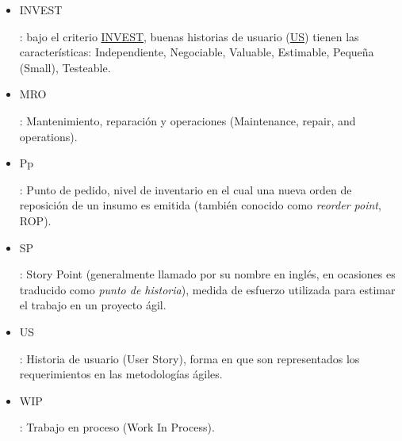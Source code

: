 \documentclass[a4paper, 12pt,twoside]{report}  %
\numberwithin{equation}{subsection} %
\begin{document}
\begin{itemize}
\item \hypertarget{INVEST}{INVEST}: bajo el criterio \hyperlink{INVEST}{INVEST}, buenas historias de usuario (\hyperlink{US}{US}) tienen las características: Independiente, Negociable, Valuable, Estimable, Pequeña (Small), Testeable.
\item \hypertarget{MRO}{MRO}: Mantenimiento, reparación y operaciones (Maintenance, repair, and operations).
\item \hypertarget{Pp}{Pp}: Punto de pedido, nivel de inventario en el cual una nueva orden de reposición de un insumo es emitida (también conocido como \textit{reorder point}, ROP).
\item \hypertarget{SP}{SP}: Story Point (generalmente llamado por su nombre en inglés, en ocasiones es traducido como \textit{punto de historia}), medida de esfuerzo utilizada para estimar el trabajo en un proyecto ágil.
\item \hypertarget{US}{US}: Historia de usuario (User Story), forma en que son representados los requerimientos en las metodologías ágiles.
\item \hypertarget{WIP}{WIP}: Trabajo en proceso (Work In Process).
\end{itemize}

\clearpage
{}
{}
\renewcommand{\listfigurename}{Índice de figuras}
\listoffigures

\clearpage
{}
{}
\renewcommand{\listtablename}{Índice de tablas}
\listoftables

\clearpage
{}

\raggedbottom
\end{document}
